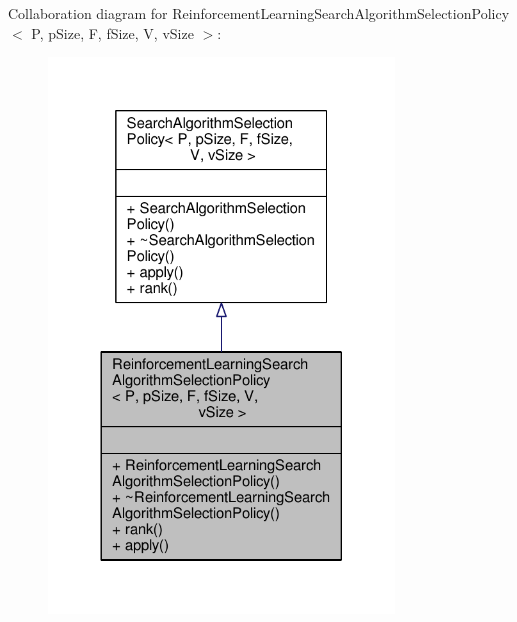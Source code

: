 Collaboration diagram for Reinforcement\+Learning\+Search\+Algorithm\+Selection\+Policy$<$ P, p\+Size, F, f\+Size, V, v\+Size $>$\+:
\nopagebreak
\begin{figure}[H]
\begin{center}
\leavevmode
\includegraphics[width=260pt]{classReinforcementLearningSearchAlgorithmSelectionPolicy__coll__graph}
\end{center}
\end{figure}
